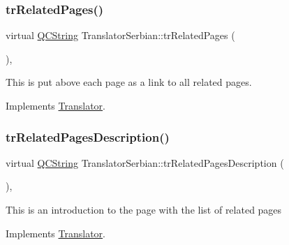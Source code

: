 \mbox{\label{class_translator_serbian_a5f96ca89eed6df0948912543c7e50b6a}} 
\subsubsection{\texorpdfstring{trRelatedPages()}{trRelatedPages()}}
{\footnotesize\ttfamily virtual \mbox{\hyperlink{class_q_c_string}{Q\+C\+String}} Translator\+Serbian\+::tr\+Related\+Pages (\begin{DoxyParamCaption}{ }\end{DoxyParamCaption})\hspace{0.3cm}{\ttfamily [inline]}, {\ttfamily [virtual]}}

This is put above each page as a link to all related pages. 

Implements \mbox{\hyperlink{class_translator}{Translator}}.

\mbox{\label{class_translator_serbian_a1af5df12499c50f74f8eb0120a922c9c}} 
\subsubsection{\texorpdfstring{trRelatedPagesDescription()}{trRelatedPagesDescription()}}
{\footnotesize\ttfamily virtual \mbox{\hyperlink{class_q_c_string}{Q\+C\+String}} Translator\+Serbian\+::tr\+Related\+Pages\+Description (\begin{DoxyParamCaption}{ }\end{DoxyParamCaption})\hspace{0.3cm}{\ttfamily [inline]}, {\ttfamily [virtual]}}

This is an introduction to the page with the list of related pages 

Implements \mbox{\hyperlink{class_translator}{Translator}}.

\mbox{\label{class_translator_serbian_a8fe68f00e076364d5936330765388301}} 
